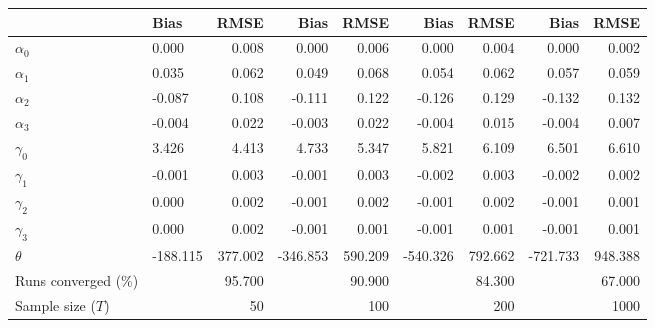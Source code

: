 
\begin{tabular}[t]{llrrrrrrr}
\toprule
  & Bias & RMSE & Bias & RMSE & Bias & RMSE & Bias & RMSE\\
\midrule
$\alpha_{0}$ & 0.000 & 0.008 & 0.000 & 0.006 & 0.000 & 0.004 & 0.000 & 0.002\\
$\alpha_{1}$ & 0.035 & 0.062 & 0.049 & 0.068 & 0.054 & 0.062 & 0.057 & 0.059\\
$\alpha_{2}$ & -0.087 & 0.108 & -0.111 & 0.122 & -0.126 & 0.129 & -0.132 & 0.132\\
$\alpha_{3}$ & -0.004 & 0.022 & -0.003 & 0.022 & -0.004 & 0.015 & -0.004 & 0.007\\
$\gamma_{0}$ & 3.426 & 4.413 & 4.733 & 5.347 & 5.821 & 6.109 & 6.501 & 6.610\\
$\gamma_{1}$ & -0.001 & 0.003 & -0.001 & 0.003 & -0.002 & 0.003 & -0.002 & 0.002\\
$\gamma_{2}$ & 0.000 & 0.002 & -0.001 & 0.002 & -0.001 & 0.002 & -0.001 & 0.001\\
$\gamma_{3}$ & 0.000 & 0.002 & -0.001 & 0.001 & -0.001 & 0.001 & -0.001 & 0.001\\
$\theta$ & -188.115 & 377.002 & -346.853 & 590.209 & -540.326 & 792.662 & -721.733 & 948.388\\
Runs converged (\%) &  & 95.700 &  & 90.900 &  & 84.300 &  & 67.000\\
Sample size ($T$) &  & 50 &  & 100 &  & 200 &  & 1000\\
\bottomrule
\end{tabular}
